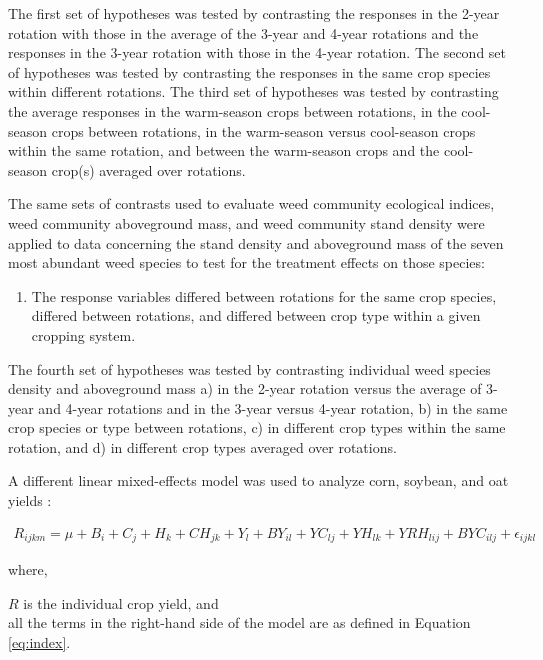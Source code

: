 \documentclass[
]{article}
\providecommand{\tightlist}{%
  \setlength{\itemsep}{0pt}\setlength{\parskip}{0pt}}
\begin{document}
The first set of hypotheses was tested by contrasting the responses in the 2-year rotation with those in the average of the 3-year and 4-year rotations and the responses in the 3-year rotation with those in the 4-year rotation. The second set of hypotheses was tested by contrasting the responses in the same crop species within different rotations. The third set of hypotheses was tested by contrasting the average responses in the warm-season crops between rotations, in the cool-season crops between rotations, in the warm-season versus cool-season crops within the same rotation, and between the warm-season crops and the cool-season crop(s) averaged over rotations.

The same sets of contrasts used to evaluate weed community ecological indices, weed community aboveground mass, and weed community stand density were applied to data concerning the stand density and aboveground mass of the seven most abundant weed species to test for the treatment effects on those species:

\begin{enumerate}
\def\labelenumi{\arabic{enumi})}
\setcounter{enumi}{3}
\tightlist
\item
  The response variables differed between rotations for the same crop species, differed between rotations, and differed between crop type within a given cropping system.
\end{enumerate}

The fourth set of hypotheses was tested by contrasting individual weed species density and aboveground mass a) in the 2-year rotation versus the average of 3-year and 4-year rotations and in the 3-year versus 4-year rotation, b) in the same crop species or type between rotations, c) in different crop types within the same rotation, and d) in different crop types averaged over rotations.

A different linear mixed-effects model was used to analyze corn, soybean, and oat yields \citep[\texttt{lme4} version 1.1-27.1,][]{batesLme4LinearMixedEffects2021}:

\begin{align}
R_{ijkm} = \mu + B_i + C_j + H_k + CH_{jk} + Y_l + BY_{il} + YC_{lj} + YH_{lk}  + YRH_{lij} + BYC_{ilj} + \epsilon_{ijkl}
\label{eq:yield}
\end{align}

where,

\(R\) is the individual crop yield, and\\
all the terms in the right-hand side of the model are as defined in Equation \eqref{eq:index}.
\end{document}
